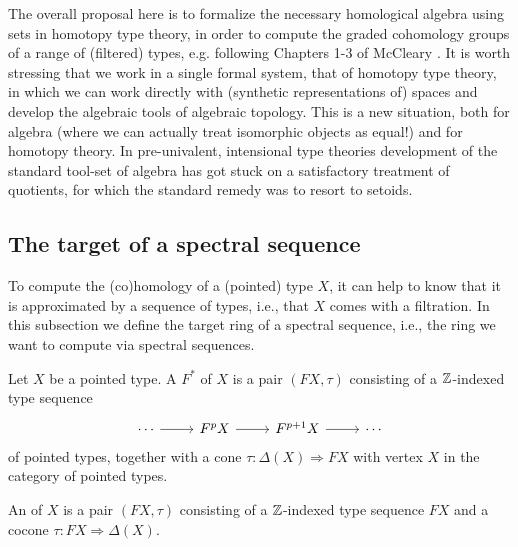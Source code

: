 \documentclass[reqno]{amsart}
\begin{document}
The overall proposal here is to formalize the necessary homological algebra 
using sets in homotopy type theory, in order to compute the graded cohomology
groups of a range of (filtered) types, e.g. following Chapters 1-3 of McCleary \cite{McCleary01}. 
It is worth stressing that we work in
a single formal system, that of homotopy type theory, in which we can 
work directly with (synthetic representations of) spaces and develop the
algebraic tools of algebraic topology. This is a new situation, both for
algebra (where we can actually treat isomorphic objects as equal!) and for
homotopy theory. 
In pre-univalent, intensional type theories development of the 
standard tool-set of algebra has got stuck on a satisfactory treatment of quotients,
for which the standard remedy was to resort to setoids.  

\subsection{The target of a spectral sequence}
To compute the (co)homology of a (pointed) type $X$, 
it can help to know that it is approximated by a sequence of types, i.e., that
$X$ comes with a filtration. 
In this subsection we define the target ring of a spectral sequence, i.e., the
ring we want to compute via spectral sequences. 

\begin{defn}
Let $X$ be a pointed type. A  $F^\ast$ of $X$ is a pair
$(FX,\tau)$ consisting of a $\mathbb{Z}$-indexed type sequence
\begin{equation*}
\begin{tikzcd}
\cdots \arrow[r] & F^pX \arrow[r] & F^{p+1}X \arrow[r] & \cdots
\end{tikzcd}
\end{equation*}
of pointed types, together with a cone $\tau:\Delta(X)\Rightarrow FX$ with vertex $X$ in the
category of pointed types. 

An  of $X$ is a pair $(FX,\tau)$ consisting of a $\mathbb{Z}$-indexed type sequence $FX$ and a cocone $\tau:FX\Rightarrow\Delta(X)$. 
\end{defn}
\end{document}
